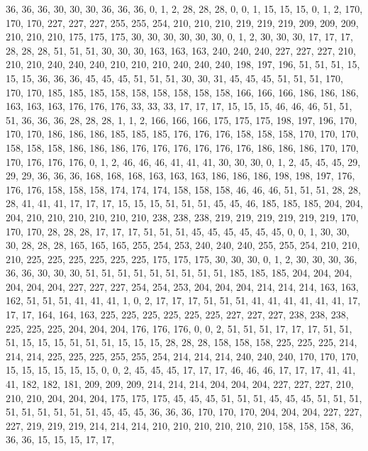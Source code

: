 36, 36, 36, 30, 30, 30, 36, 36, 36, 0, 1, 2, 28, 28, 28, 0, 0, 1, 15, 15, 15, 0, 1, 2, 170, 170, 170, 227, 227, 227, 255, 255,
254, 210, 210, 210, 219, 219, 219, 209, 209, 209, 210, 210, 210, 175, 175, 175, 30, 30, 30, 30, 30, 30, 0, 1, 2, 30, 30, 30, 17, 17, 17, 28,
28, 28, 51, 51, 51, 30, 30, 30, 163, 163, 163, 240, 240, 240, 227, 227, 227, 210, 210, 210, 240, 240, 240, 210, 210, 210, 240, 240, 240, 198, 197, 196,
51, 51, 51, 15, 15, 15, 36, 36, 36, 45, 45, 45, 51, 51, 51, 30, 30, 31, 45, 45, 45, 51, 51, 51, 170, 170, 170, 185, 185, 185, 158, 158,
158, 158, 158, 158, 166, 166, 166, 186, 186, 186, 163, 163, 163, 176, 176, 176, 33, 33, 33, 17, 17, 17, 15, 15, 15, 46, 46, 46, 51, 51, 51, 36,
36, 36, 28, 28, 28, 1, 1, 2, 166, 166, 166, 175, 175, 175, 198, 197, 196, 170, 170, 170, 186, 186, 186, 185, 185, 185, 176, 176, 176, 158, 158, 158,
170, 170, 170, 158, 158, 158, 186, 186, 186, 176, 176, 176, 176, 176, 176, 186, 186, 186, 170, 170, 170, 176, 176, 176, 0, 1, 2, 46, 46, 46, 41, 41,
41, 30, 30, 30, 0, 1, 2, 45, 45, 45, 29, 29, 29, 36, 36, 36, 168, 168, 168, 163, 163, 163, 186, 186, 186, 198, 198, 197, 176, 176, 176, 158,
158, 158, 174, 174, 174, 158, 158, 158, 46, 46, 46, 51, 51, 51, 28, 28, 28, 41, 41, 41, 17, 17, 17, 15, 15, 15, 51, 51, 51, 45, 45, 46,
185, 185, 185, 204, 204, 204, 210, 210, 210, 210, 210, 210, 238, 238, 238, 219, 219, 219, 219, 219, 219, 170, 170, 170, 28, 28, 28, 17, 17, 17, 51, 51,
51, 45, 45, 45, 45, 45, 45, 0, 0, 1, 30, 30, 30, 28, 28, 28, 165, 165, 165, 255, 254, 253, 240, 240, 240, 255, 255, 254, 210, 210, 210, 225,
225, 225, 225, 225, 225, 175, 175, 175, 30, 30, 30, 0, 1, 2, 30, 30, 30, 36, 36, 36, 30, 30, 30, 51, 51, 51, 51, 51, 51, 51, 51, 51,
185, 185, 185, 204, 204, 204, 204, 204, 204, 227, 227, 227, 254, 254, 253, 204, 204, 204, 214, 214, 214, 163, 163, 162, 51, 51, 51, 41, 41, 41, 1, 0,
2, 17, 17, 17, 51, 51, 51, 41, 41, 41, 41, 41, 41, 17, 17, 17, 164, 164, 163, 225, 225, 225, 225, 225, 225, 227, 227, 227, 238, 238, 238, 225,
225, 225, 204, 204, 204, 176, 176, 176, 0, 0, 2, 51, 51, 51, 17, 17, 17, 51, 51, 51, 15, 15, 15, 51, 51, 51, 15, 15, 15, 28, 28, 28,
158, 158, 158, 225, 225, 225, 214, 214, 214, 225, 225, 225, 255, 255, 254, 214, 214, 214, 240, 240, 240, 170, 170, 170, 15, 15, 15, 15, 15, 15, 0, 0,
2, 45, 45, 45, 17, 17, 17, 46, 46, 46, 17, 17, 17, 41, 41, 41, 182, 182, 181, 209, 209, 209, 214, 214, 214, 204, 204, 204, 227, 227, 227, 210,
210, 210, 204, 204, 204, 175, 175, 175, 45, 45, 45, 51, 51, 51, 45, 45, 45, 51, 51, 51, 51, 51, 51, 51, 51, 51, 45, 45, 45, 36, 36, 36,
170, 170, 170, 204, 204, 204, 227, 227, 227, 219, 219, 219, 214, 214, 214, 210, 210, 210, 210, 210, 210, 158, 158, 158, 36, 36, 36, 15, 15, 15, 17, 17,
